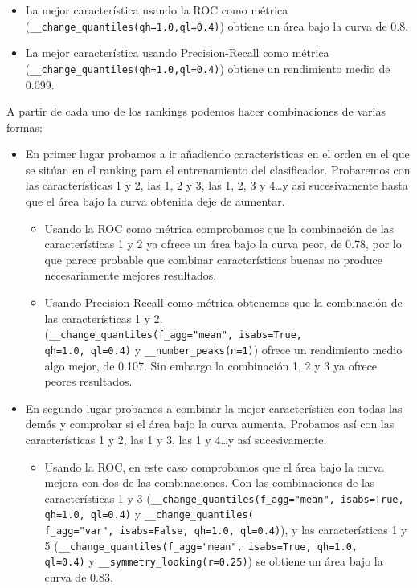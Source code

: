 \documentclass[a4paper,12pt,twoside,oldfontcommands]{memoir}
\begin{document}
\begin{itemize}
    \item La mejor característica usando la ROC como métrica (\texttt{\_\_change\_quantiles(qh=1.0,ql=0.4)}) obtiene un área bajo la curva de 0.8. 
    \item La mejor característica usando Precision-Recall como métrica (\texttt{\_\_change\_quantiles(qh=1.0,ql=0.4)}) obtiene un rendimiento medio de 0.099. 
\end{itemize}

A partir de cada uno de los rankings podemos hacer combinaciones de varias formas: 

\begin{itemize}
    \item En primer lugar probamos a ir añadiendo características en el orden en el que se sitúan en el ranking para el entrenamiento del clasificador. Probaremos con las características 1 y 2, las 1, 2 y 3, las 1, 2, 3 y 4\dots y así sucesivamente hasta que el área bajo la curva obtenida deje de aumentar. 
    \begin{itemize}
        \item Usando la ROC como métrica comprobamos que la combinación de las características 1 y 2 ya ofrece un área bajo la curva peor, de 0.78, por lo que parece probable que combinar características buenas no produce necesariamente mejores resultados.
        \item Usando Precision-Recall como métrica obtenemos que la combinación de las características 1 y 2.
        \\(\texttt{\_\_change\_quantiles(f\_agg="mean", isabs=True,\\ qh=1.0, ql=0.4)} y \texttt{\_\_number\_peaks(n=1)}) ofrece un rendimiento medio algo mejor, de 0.107. Sin embargo la combinación 1, 2 y 3 ya ofrece peores resultados.
    \end{itemize} 
    \item En segundo lugar probamos a combinar la mejor característica con todas las demás y comprobar si el área bajo la curva aumenta. Probamos así con las características 1 y 2, las 1 y 3, las 1 y 4\dots y así sucesivamente. 
    \begin{itemize}
        \item Usando la ROC, en este caso comprobamos que el área bajo la curva mejora con dos de las combinaciones. Con las combinaciones de las características 1 y 3 (\texttt{\_\_change\_quantiles(f\_agg="mean", isabs=True, qh=1.0, ql=0.4)} y \texttt{\_\_change\_quantiles(\\f\_agg="var", isabs=False, qh=1.0, ql=0.4)}), y las características 1 y 5 (\texttt{\_\_change\_quantiles(f\_agg="mean", isabs=True, qh=1.0,\\ ql=0.4)} y \texttt{\_\_symmetry\_looking(r=0.25)}) se obtiene un área bajo la curva de 0.83. 

\end{itemize}
\end{itemize}
\end{document}
